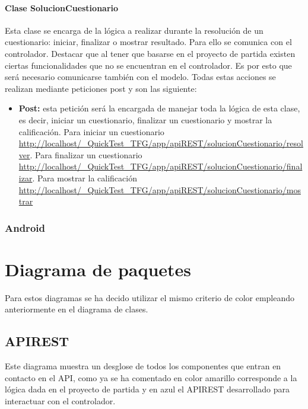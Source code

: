 
\paragraph{Clase SolucionCuestionario}

Esta clase se encarga de la lógica a realizar durante la resolución de un cuestionario: iniciar, finalizar o mostrar resultado. Para ello se comunica con el controlador. Destacar que al tener que basarse en el proyecto de partida existen ciertas funcionalidades que no se encuentran en el controlador. Es por esto que será necesario comunicarse también con el modelo.
Todas estas acciones se realizan mediante peticiones post y son las siguiente:

\begin{itemize}

	\item \textbf{Post:} esta petición será la encargada de manejar toda la lógica de esta clase, es decir, iniciar un cuestionario, finalizar un cuestionario y mostrar la calificación. Para iniciar un cuestionario \url{http://localhost/_QuickTest_TFG/app/apiREST/solucionCuestionario/resolver}. Para finalizar un cuestionario \url{http://localhost/_QuickTest_TFG/app/apiREST/solucionCuestionario/finalizar}. \linebreak Para mostrar la calificación \url{http://localhost/_QuickTest_TFG/app/apiREST/solucionCuestionario/mostrar}
\end{itemize}


\subsubsection{Android}


\section{Diagrama de paquetes}

Para estos diagramas se ha decido utilizar el mismo criterio de color empleando anteriormente en el diagrama de clases.

\subsection{APIREST}

Este diagrama muestra un desglose de todos los componentes que entran en contacto en el API, como ya se ha comentado en color amarillo corresponde a la lógica dada en el proyecto de partida y en azul el APIREST desarrollado para interactuar con el controlador.

